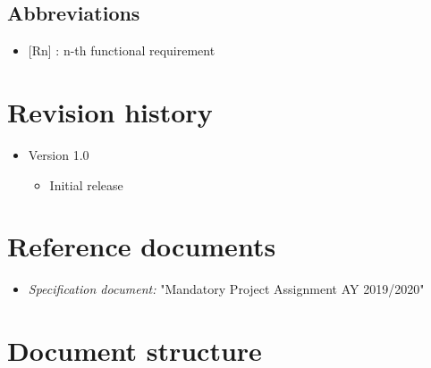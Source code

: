 			\subsection{Abbreviations}
				\begin{itemize}
					\item {[Rn]} : n-th functional requirement
				\end{itemize}
		\section{Revision history}
			\begin{itemize}
				\item Version 1.0
					\begin{itemize}
						\item Initial release
					\end{itemize}
			\end{itemize}
		\section{Reference documents}
			\begin{itemize}
				\item \textit{Specification document:} "Mandatory Project Assignment AY 2019/2020"
			\end{itemize}
		\section{Document structure}

